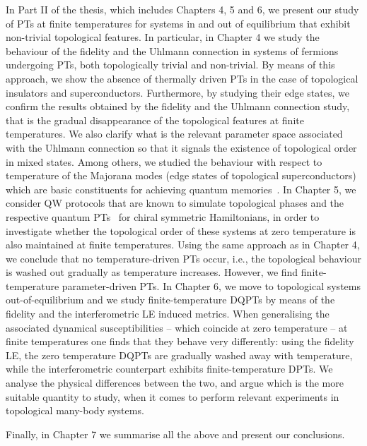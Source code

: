 In Part II of the thesis, which includes Chapters 4, 5 and 6, we present our study of PTs at finite temperatures for systems in and out of equilibrium that exhibit non-trivial topological features. In particular, in Chapter 4 we study the behaviour of the fidelity and the Uhlmann connection in systems of fermions undergoing PTs, both topologically trivial and non-trivial. By means of this approach, we show the absence of thermally driven PTs in the case of topological insulators and superconductors. Furthermore, by studying their edge states, we confirm the results obtained by the fidelity and the Uhlmann connection study, that is the gradual disappearance of the topological features at finite temperatures. We also clarify what is the relevant parameter space associated with the Uhlmann connection so that it signals the existence of topological order in mixed states. Among others, we studied the behaviour with respect to temperature of the Majorana modes (edge states of topological superconductors) which are basic constituents for achieving quantum memories~\cite{ali:12,ipp:riz:gio:maz:16,majorana:17,majorana:twist:17}.  
In Chapter 5, we consider QW protocols that are known to simulate topological phases and the respective quantum PTs~\cite{kit:rud:ber:dem:10,kit:12} for chiral symmetric Hamiltonians, in order to investigate whether the topological order of these systems at zero temperature is also maintained at finite temperatures. 
Using the same approach as in Chapter 4, we conclude that no temperature-driven PTs occur, i.e., the topological behaviour is washed out gradually as temperature increases. However, we find finite-temperature parameter-driven PTs. In Chapter 6, we move to topological systems out-of-equilibrium and we study finite-temperature DQPTs by means of the fidelity and the interferometric LE induced metrics. When generalising the associated dynamical susceptibilities -- which coincide at zero temperature -- at finite temperatures one finds that they behave very differently: using the fidelity LE, the zero temperature DQPTs are gradually washed away with temperature, while the interferometric counterpart exhibits finite-temperature DPTs. We analyse the physical differences between the two, and argue which is the more suitable quantity to study, when it comes to perform relevant experiments in topological many-body systems.

Finally, in Chapter 7 we summarise all the above and present our conclusions.

%
%
%
